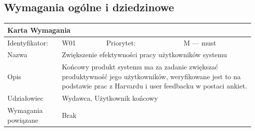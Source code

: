 \documentclass[a4paper,11pt]{report}
\begin{document}
\subsection {Wymagania ogólne i dziedzinowe}
		\begin{tabular}{|p{3cm}|p{2cm}|p{2cm}|p{6cm}|}
		\hline
		\multicolumn{4}{|p{12 cm}|}{Karta Wymagania}\\
		\hline
		Identyfikator: & W01 & Priorytet: & M — must\\
		\hline
		Nazwa & \multicolumn{3}{|p{10 cm}|}{Zwiększenie efektywności pracy użytkowników systemu}\\
		\hline
		Opis & \multicolumn{3}{|p{10 cm}|}{Końcowy produkt systemu ma za zadanie zwiększać produktywność jego użytkowników, weryfikowane jest to na podstawie prac z Harvardu i user feedbacku w postaci ankiet.}\\
		\hline
		Udziałowiec & \multicolumn{3}{|p{10 cm}|}{Wydawca, Użytkownik końcowy}\\
		\hline
		Wymagania powiązane & \multicolumn{3}{|p{10 cm}|}{Brak}\\
		\hline
		\end{tabular}\\
\end{document}
